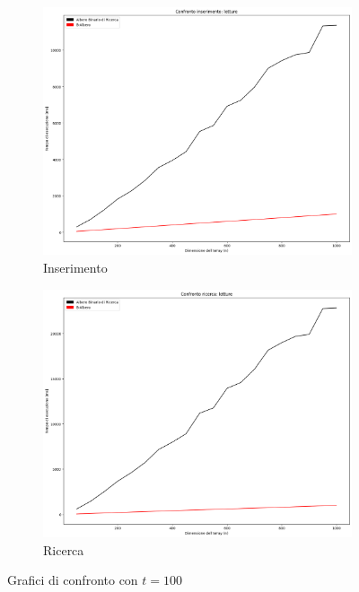 \begin{figure}[H]
    \centering
    \begin{subfigure}[b]{0.49\textwidth}
        \centering
        \includegraphics[width=\textwidth]{comparison-graphs/insert-wr-t100.png}
        \caption{Inserimento}
        \label{fig:compgraphinserttimet100}
    \end{subfigure}
    \hfill
    \begin{subfigure}[b]{0.49\textwidth}
        \centering
        \includegraphics[width=\textwidth]{comparison-graphs/search-wr-t100.png}
        \caption{Ricerca}
        \label{fig:compgraphsearchtimet100}
    \end{subfigure}
    \caption{Grafici di confronto con $t=100$}
    \label{fig:compgraphtimest100}
\end{figure}

